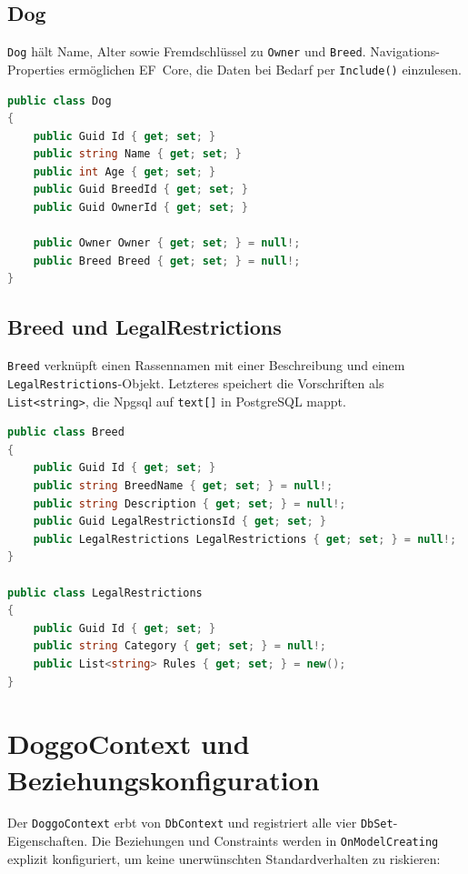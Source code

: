 \subsection{Dog}
\label{subsec:model-dog}

\texttt{Dog} hält Name, Alter sowie Fremdschlüssel zu \texttt{Owner} und \texttt{Breed}.
Navigations-Properties ermöglichen EF~Core, die Daten bei Bedarf per \texttt{Include()}
einzulesen.

\begin{lstlisting}[language=csharp, caption={Modell Dog.cs}, label=lst:dog, float=htbp]
public class Dog
{
    public Guid Id { get; set; }
    public string Name { get; set; }
    public int Age { get; set; }
    public Guid BreedId { get; set; }
    public Guid OwnerId { get; set; }

    public Owner Owner { get; set; } = null!;
    public Breed Breed { get; set; } = null!;
}
\end{lstlisting}

\subsection{Breed und LegalRestrictions}
\label{subsec:model-breed}

\texttt{Breed} verknüpft einen Rassennamen mit einer Beschreibung und einem
\texttt{LegalRestrictions}-Objekt. Letzteres speichert die Vorschriften als
\texttt{List<string>}, die Npgsql auf \texttt{text[]} in PostgreSQL mappt.

\begin{lstlisting}[language=csharp, caption={Modelle Breed.cs und LegalRestrictions.cs}, label=lst:breed, float=htbp]
public class Breed
{
    public Guid Id { get; set; }
    public string BreedName { get; set; } = null!;
    public string Description { get; set; } = null!;
    public Guid LegalRestrictionsId { get; set; }
    public LegalRestrictions LegalRestrictions { get; set; } = null!;
}

public class LegalRestrictions
{
    public Guid Id { get; set; }
    public string Category { get; set; } = null!;
    public List<string> Rules { get; set; } = new();
}
\end{lstlisting}

\section{DoggoContext und Beziehungskonfiguration}
\label{sec:dbcontext}

Der \texttt{DoggoContext} erbt von \texttt{DbContext} und registriert alle vier
\texttt{DbSet}-Eigenschaften. Die Beziehungen und Constraints werden in
\texttt{OnModelCreating} explizit konfiguriert, um keine unerwünschten Standardverhalten
zu riskieren:

